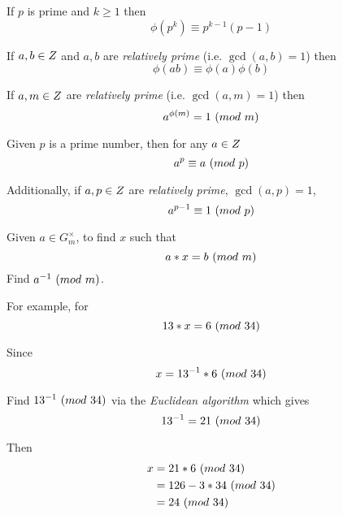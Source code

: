 \begin{theorem}
    If $p$ is prime and $k \ge 1$ then
    \begin{equation}
        \phi(p^k) \equiv p^{k - 1}(p - 1)
    \end{equation}
\end{theorem}

\begin{theorem}
    If $a, b \in \relax{Z}$ and $a, b$ are \textit{relatively prime} (i.e. $\gcd(a, b) = 1$) then
    \begin{equation}
        \phi(ab) \equiv \phi(a) \phi(b)
    \end{equation}
\end{theorem}

\begin{theorem}
    If $a, m \in \relax{Z}$ are \textit{relatively prime} (i.e. $\gcd(a, m) = 1$) then
    \begin{equation}
        a^{\phi(m)} = 1 \ (\relax{mod}\ m)
    \end{equation}
\end{theorem}

\begin{theorem}
    Given $p$ is a prime number, then for any $a \in \relax{Z}$
    \begin{equation}
        a^p \equiv a \ (\relax{mod}\ p)
    \end{equation}
    
    Additionally, if $a, p \in \relax{Z}$ are \textit{relatively prime}, $\gcd(a, p) = 1$,
    \begin{equation}
        a^{p - 1} \equiv 1 \ (\relax{mod}\ p)
    \end{equation}
\end{theorem}

\begin{remark}
    Given $a \in G^{\times}_{m}$, to find $x$ such that 
    \begin{equation}
        a \ast x = b \ (\relax{mod}\ m)
    \end{equation}
    Find ${a}^{-1} \ (\relax{mod}\ m)$.
    
    For example, for
    \begin{equation}
        13 \ast x = 6 \ (\relax{mod}\ 34)
    \end{equation}
    
    Since
    \begin{equation}
        x = {13}^{-1} \ast 6 \ (\relax{mod}\ 34)
    \end{equation}
    
    Find ${13}^{-1} \ (\relax{mod}\ 34)$ via the \textit{Euclidean algorithm} which gives
    \begin{equation}
        {13}^{-1} = 21 \ (\relax{mod}\ 34)
    \end{equation}
    
    Then
    \begin{align}
        x &= 21 \ast 6 \ (\relax{mod}\ 34) \\
          &= 126 - 3 \ast 34 \ (\relax{mod}\ 34) \\
          &= 24 \ (\relax{mod}\ 34)
    \end{align}
\end{remark}

